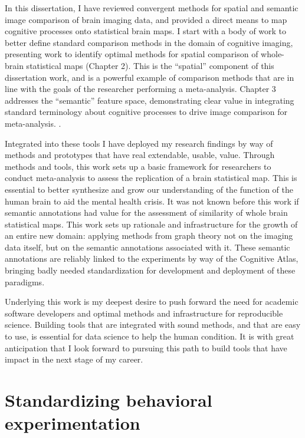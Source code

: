 \documentclass{report}
\begin{document}
In this dissertation, I have reviewed convergent methods for spatial and semantic image comparison of brain imaging data, and provided a direct means to map cognitive processes onto statistical brain maps. I start with a body of work to better define standard comparison
methods in the domain of cognitive imaging, presenting work to identify
optimal methods for spatial comparison of whole-brain statistical maps
(Chapter 2). This is the ``spatial'' component of this dissertation
work, and is a powerful example of comparison methods that are in line
with the goals of the researcher performing a meta-analysis. Chapter 3
addresses the ``semantic'' feature space, demonstrating clear value in integrating
standard terminology about cognitive processes to drive image comparison
for meta-analysis. .

Integrated into these tools I have deployed my research findings by way
of methods and prototypes that have real extendable, usable, value.
Through methods and tools, this work sets up a basic framework for
researchers to conduct meta-analysis to assess the replication of a brain statistical
map. This is essential to better synthesize and grow our understanding of the function of the human brain to aid the mental health crisis. It was not known before this work if semantic annotations had value for the assessment of similarity of whole brain statistical maps. This work sets up rationale
and infrastructure for the growth of an entire new domain: applying
methods from graph theory not on the imaging data itself, but on the
semantic annotations associated with it. These semantic annotations are
reliably linked to the experiments by way of the Cognitive Atlas,
bringing badly needed standardization for development and deployment of
these paradigms.

Underlying this work is my deepest desire to push forward the need for
academic software developers and optimal methods and infrastructure for reproducible
science. Building tools that are integrated with sound methods, and that are easy to use, is essential for data science to help the human condition. It is with great anticipation that I look forward to pursuing this path to build tools that have impact in the next stage of my career. 

\appendix

\chapter{Standardizing behavioral experimentation}
\end{document}
